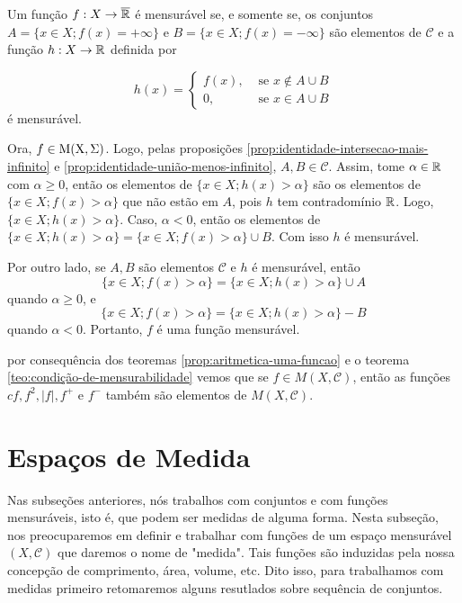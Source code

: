     \begin{theorem}
    \label{teo:condição-de-mensurabilidade}
        Um função $f: X \to \operatorname{\overline{\mathbb{R}}}$ é mensurável se, e somente se, os conjuntos 
        $A = \{ x \in X; f(x) = +\infty\}$ e $B = \{x \in X; f(x) = -\infty\}$
 são elementos de $\mathcal{C}$ e a função $h: X \to \mathbb{R}$ definida por
 
 $$
 h(x) = \left\{\begin{array}{cc}
     f(x), & \textrm{\ se } x \notin A\cup B  \\
      0,& \textrm{\ se } x \in A\cup B
 \end{array}\right.
 $$
 é mensurável.
 \end{theorem}
\begin{prova}
    Ora, $f \in \operatorname{M(X, \Sigma)}$. Logo, pelas proposições \ref{prop:identidade-intersecao-mais-infinito} e \ref{prop:identidade-união-menos-infinito}, $A,B \in \mathcal{C}$.
    Assim, tome $\alpha \in \mathbb{R}$ com $\alpha \geq 0$, então os elementos de $\{x \in X; h(x) > \alpha\}$ são os elementos de $\{x \in X; f(x) > \alpha\}$ que não estão em $A$, pois $h$ tem contradomínio $\mathbb{R}$.
    Logo, $\{x \in X; h(x) > \alpha\}$.
    Caso, $\alpha < 0$, então os elementos de $\{x \in X; h(x) > \alpha\} = \{x \in  X ; f(x) > \alpha\} \cup B $.
    Com isso $h$ é mensurável.

    Por outro lado,  se $A,B$ são elementos $\mathcal{C}$ e $h$ é mensurável, então
    $$\{x \in X; f(x) > \alpha\} = \{x \in  X ; h(x) > \alpha\} \cup A $$
    quando $\alpha \geq 0$, e 
    $$\{x \in X; f(x) > \alpha\} = \{x \in  X ; h(x) > \alpha\} - B $$
    quando  $\alpha < 0$.
    Portanto, $f$ é uma função mensurável.
\end{prova}

por consequência dos teoremas \ref{prop:aritmetica-uma-funcao} e o teorema \ref{teo:condição-de-mensurabilidade} vemos que se $ f \in M(X,\mathcal{C})$, então as funções $cf, f^2, |f|, f^+$ e $f^-$ também são elementos de $M(X, \mathcal{C})$.

\section{Espaços de Medida}

Nas subseções anteriores, nós trabalhos com conjuntos e com funções mensuráveis, isto é, que podem ser medidas de alguma forma.
Nesta subseção, nos preocuparemos em definir e trabalhar com funções de um espaço mensurável $(X, \mathcal{C})$ que daremos o nome de "medida".
Tais funções são induzidas pela nossa concepção de comprimento, área, volume, etc.
Dito isso, para trabalhamos com medidas primeiro retomaremos alguns resutlados sobre sequência de conjuntos.

